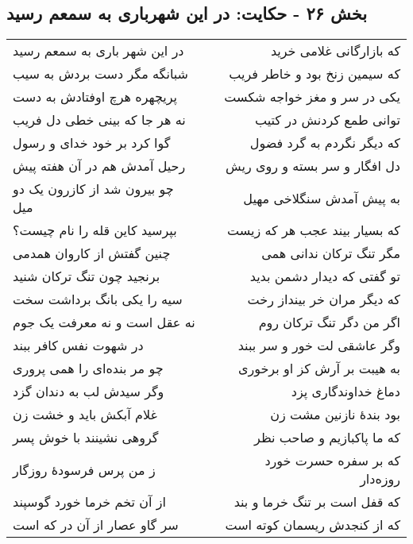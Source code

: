 \begin{center}
\section*{بخش ۲۶ - حکایت: در این شهرباری به سمعم رسید}
\label{sec:026}
\begin{longtable}{l p{0.5cm} r}
در این شهر باری به سمعم رسید
&&
که بازارگانی غلامی خرید
\\
شبانگه مگر دست بردش به سیب
&&
که سیمین زنخ بود و خاطر فریب
\\
پریچهره هرچ اوفتادش به دست
&&
یکی در سر و مغز خواجه شکست
\\
نه هر جا که بینی خطی دل فریب
&&
توانی طمع کردنش در کتیب
\\
گوا کرد بر خود خدای و رسول
&&
که دیگر نگردم به گرد فضول
\\
رحیل آمدش هم در آن هفته پیش
&&
دل افگار و سر بسته و روی ریش
\\
چو بیرون شد از کازرون یک دو میل
&&
به پیش آمدش سنگلاخی مهیل
\\
بپرسید کاین قله را نام چیست؟
&&
که بسیار بیند عجب هر که زیست
\\
چنین گفتش از کاروان همدمی
&&
مگر تنگ ترکان ندانی همی
\\
برنجید چون تنگ ترکان شنید
&&
تو گفتی که دیدار دشمن بدید
\\
سیه را یکی بانگ برداشت سخت
&&
که دیگر مران خر بینداز رخت
\\
نه عقل است و نه معرفت یک جوم
&&
اگر من دگر تنگ ترکان روم
\\
در شهوت نفس کافر ببند
&&
وگر عاشقی لت خور و سر ببند
\\
چو مر بنده‌ای را همی پروری
&&
به هیبت بر آرش کز او برخوری
\\
وگر سیدش لب به دندان گزد
&&
دماغ خداوندگاری پزد
\\
غلام آبکش باید و خشت زن
&&
بود بندهٔ نازنین مشت زن
\\
گروهی نشینند با خوش پسر
&&
که ما پاکبازیم و صاحب نظر
\\
ز من پرس فرسودهٔ روزگار
&&
که بر سفره حسرت خورد روزه‌دار
\\
از آن تخم خرما خورد گوسپند
&&
که قفل است بر تنگ خرما و بند
\\
سر گاو عصار از آن در که است
&&
که از کنجدش ریسمان کوته است
\\
\end{longtable}
\end{center}
